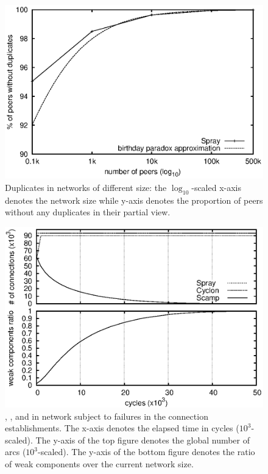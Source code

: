 \begin{figure}
  \centering
  \includegraphics[width=.8\textwidth]{img/spray/duplicates.eps}
  \caption{\label{fig:duplicates}Duplicates in networks of different size: the
    $\log_{10}$-scaled x-axis denotes the network size while y-axis denotes the
    proportion of peers without any duplicates in their partial view.}
\end{figure}

\begin{figure}
  \centering \includegraphics[width=.8\textwidth]{img/spray/degen.eps}
  \caption{\label{fig:degeneration}\CYCLON, \SCAMP, and \SPRAY in network
    subject to failures in the connection establishments. The x-axis denotes
    the elapsed time in cycles ($10^3$-scaled). The y-axis of the top figure
    denotes the global number of arcs ($10^3$-scaled). The y-axis of the bottom
    figure denotes the ratio of weak components over the current network size.}
\end{figure}

